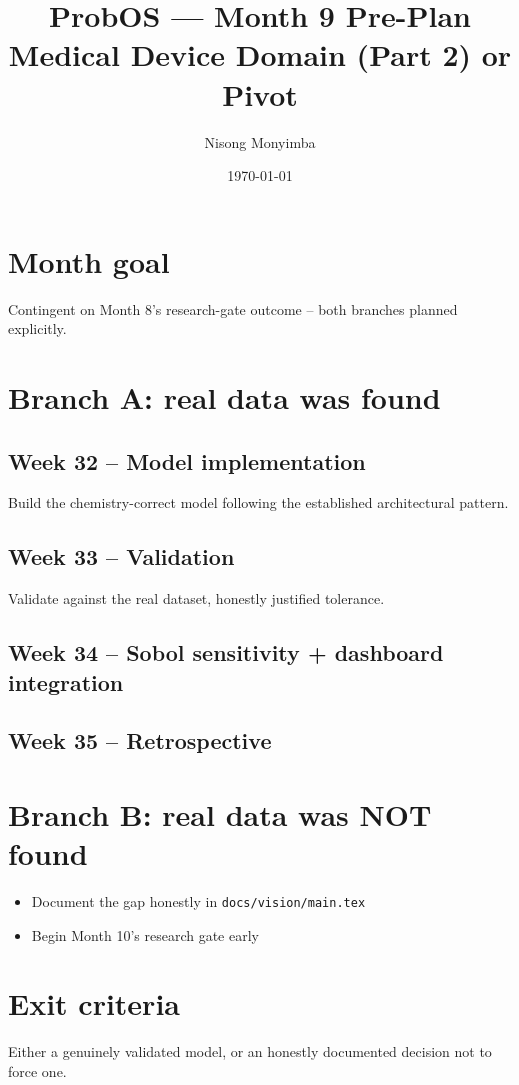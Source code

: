 \documentclass[11pt]{article}
\title{ProbOS --- Month 9 Pre-Plan\\Medical Device Domain (Part 2) or Pivot}
\author{Nisong Monyimba}
\date{\today}
\begin{document}
\maketitle

\section*{Month goal}
Contingent on Month 8's research-gate outcome -- both branches
planned explicitly.

\section*{Branch A: real data was found}

\subsection*{Week 32 -- Model implementation}
Build the chemistry-correct model following the established
architectural pattern.

\subsection*{Week 33 -- Validation}
Validate against the real dataset, honestly justified tolerance.

\subsection*{Week 34 -- Sobol sensitivity + dashboard integration}

\subsection*{Week 35 -- Retrospective}

\section*{Branch B: real data was NOT found}
\begin{itemize}[leftmargin=*]
  \item Document the gap honestly in \texttt{docs/vision/main.tex}
  \item Begin Month 10's research gate early
\end{itemize}

\section*{Exit criteria}
Either a genuinely validated model, or an honestly documented
decision not to force one.
\end{document}
